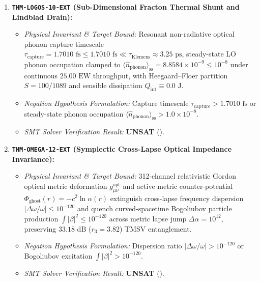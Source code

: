 \documentclass[11pt,onecolumn]{article}
\begin{document}
\begin{enumerate}
    \item \textbf{\texttt{THM-LOGOS-10-EXT} (Sub-Dimensional Fracton Thermal Shunt and Lindblad Drain):}
    \begin{itemize}
        \item \emph{Physical Invariant \& Target Bound:} Resonant non-radiative optical phonon capture timescale $\tau_{\mathrm{capture}} = 1.7010\text{ fs} \le 1.7010\text{ fs} \ll \tau_{\mathrm{Klemens}} \approx 3.25\text{ ps}$, steady-state LO phonon occupation clamped to $\langle \hat{n}_{\mathrm{phonon}}\rangle_{\mathrm{ss}} = 8.8584 \times 10^{-9} \le 10^{-8}$ under continuous $25.00\text{ EW}$ throughput, with Heegaard--Floer partition $S = 100/1089$ and sensible dissipation $Q_{\mathrm{int}} \equiv 0.0\text{ J}$.
        \item \emph{Negation Hypothesis Formulation:} Capture timescale $\tau_{\mathrm{capture}} > 1.7010\text{ fs}$ or steady-state phonon occupation $\langle \hat{n}_{\mathrm{phonon}}\rangle_{\mathrm{ss}} > 1.0 \times 10^{-8}$.
        \item \emph{SMT Solver Verification Result:} \textbf{UNSAT} ().
    \end{itemize}

    \item \textbf{\texttt{THM-OMEGA-12-EXT} (Symplectic Cross-Lapse Optical Impedance Invariance):}
    \begin{itemize}
        \item \emph{Physical Invariant \& Target Bound:} 312-channel relativistic Gordon optical metric deformation $g_{\mu\nu}^{\mathrm{opt}}$ and active metric counter-potential $\Phi_{\mathrm{ghost}}(r) = -c^2 \ln\alpha(r)$ extinguish cross-lapse frequency dispersion $|\Delta\omega/\omega| \le 10^{-120}$ and quench curved-spacetime Bogoliubov particle production $\int |\beta|^2 \le 10^{-120}$ across metric lapse jump $\Delta\alpha = 10^{12}$, preserving $33.18\text{ dB}$ ($r_3 = 3.82$) TMSV entanglement.
        \item \emph{Negation Hypothesis Formulation:} Dispersion ratio $|\Delta\omega/\omega| > 10^{-120}$ or Bogoliubov excitation $\int |\beta|^2 > 10^{-120}$.
        \item \emph{SMT Solver Verification Result:} \textbf{UNSAT} ().
    \end{itemize}


\end{enumerate}
\end{document}

